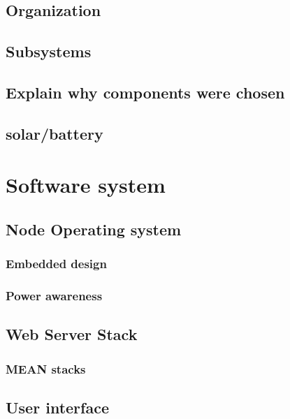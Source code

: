\documentclass[journal,transmag]{IEEEtran}
\begin{document}
	\subsection{Organization}
    
	\subsection{Subsystems}
    
    \subsection{Explain why components were chosen}
    
    \subsection{solar/battery}






\section{Software system}

	\subsection{Node Operating system}
    
    	\subsubsection{Embedded design}
        
        \subsubsection{Power awareness}
        
	\subsection{Web Server Stack}
    	
       \subsubsection{MEAN stacks}
    
    \subsection{User interface}
    
\end{document}

